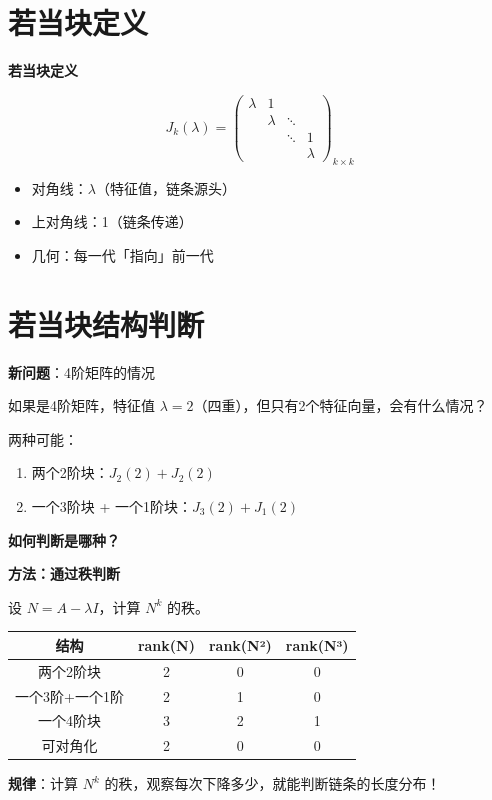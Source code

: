 \documentclass[aspectratio=169,12pt]{beamer}
\begin{document}
\section{若当块定义}

\begin{frame}
\fontsize{11}{13}\selectfont
\centerline{\textbf{若当块定义}}

\[
J_k(\lambda) = 
\begin{pmatrix}
\lambda & 1 & & \\
& \lambda & \ddots & \\
& & \ddots & 1 \\
& & & \lambda
\end{pmatrix}_{k \times k}
\]

\bigskip
\begin{itemize}
    \item 对角线：$\lambda$（特征值，链条源头）
    \item 上对角线：1（链条传递）
    \item 几何：每一代「指向」前一代
\end{itemize}
\end{frame}

\section{若当块结构判断}

\begin{frame}
\fontsize{10}{12}\selectfont
\centerline{\textbf{新问题}：4阶矩阵的情况}

\bigskip
如果是4阶矩阵，特征值 $\lambda = 2$（四重），但只有2个特征向量，会有什么情况？

\bigskip
两种可能：
\begin{enumerate}
    \item 两个2阶块：$J_2(2) + J_2(2)$
    \item 一个3阶块 + 一个1阶块：$J_3(2) + J_1(2)$
\end{enumerate}

\pause
\bigskip
\centerline{\textbf{如何判断是哪种？}}
\end{frame}

\begin{frame}
\fontsize{10}{12}\selectfont
\centerline{\textbf{方法：通过秩判断}}

\bigskip
设 $N = A - \lambda I$，计算 $N^k$ 的秩。

\begin{center}
\begin{tabular}{|c|c|c|c|}
\hline
结构 & rank(N) & rank(N²) & rank(N³) \\
\hline
两个2阶块 & 2 & 0 & 0 \\
\hline
一个3阶+一个1阶 & 2 & 1 & 0 \\
\hline
一个4阶块 & 3 & 2 & 1 \\
\hline
可对角化 & 2 & 0 & 0 \\
\hline
\end{tabular}
\end{center}

\pause
\bigskip
\centerline{\textbf{规律}：计算 $N^k$ 的秩，观察每次下降多少，就能判断链条的长度分布！}
\end{frame}
\end{document}
